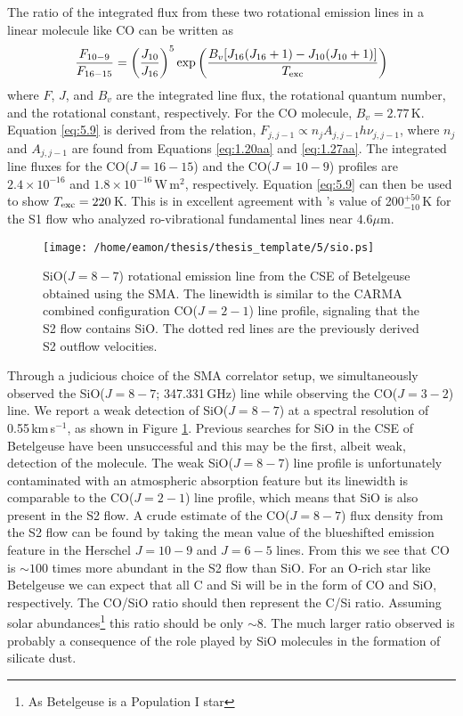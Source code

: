 The ratio of the integrated flux from these two rotational emission lines in a linear molecule like CO can be written as 
\begin{equation}
\frac{F_{10-9}}{F_{16-15}}=\left(\frac{J_{10}}{J_{16}} \right)^5 \mathrm{exp}\left(\frac{B_{v}[J_{16}(J_{16}+1)-J_{10}(J_{10} +1)]}{T_{\rm{exc}}} \right)
\label{eq:5.9}
\end{equation}
where $F$, $J$, and $B_{v}$ are the integrated line flux, the rotational quantum number, and the rotational constant, respectively. For the CO molecule, $B_{v}= 2.77$\,K. Equation \ref{eq:5.9} is derived from the relation, $F_{j,j-1} \propto n_{j}A_{j,j-1}h\nu _{j,j-1}$, where $n_{j}$ and $A_{j,j-1}$ are found from Equations \ref{eq:1.20aa} and \ref{eq:1.27aa}. The integrated line fluxes for the CO($J=16-15$) and the CO($J=10-9$) profiles are $2.4\times 10^{-16}$  and $1.8\times 10^{-16}$\,W\,m$^2$, respectively. Equation \ref{eq:5.9} can then be used to show $T_{\rm{exc}} = 220$\,K. This is in excellent agreement with \citeauthor{bernat_1979}'s \citeyear{bernat_1979} value of 200$^{+50}_{-10}$\,K for the S1 flow who analyzed ro-vibrational fundamental lines near $4.6\mu$m.

\begin{figure}[!hbt]
\centering 
\texttt{[image: /home/eamon/thesis/thesis\_template/5/sio.ps]}
\caption[SiO rotational emission line from the CSE of Betelgeuse]{SiO($J=8-7$) rotational emission line from the CSE of Betelgeuse obtained using the SMA. The linewidth is similar to the CARMA combined configuration CO($J=2-1$) line profile, signaling that the S2 flow contains SiO. The dotted red lines are the previously derived S2 outflow velocities.}
\label{fig:5.12b}
\end{figure}

Through a judicious choice of the SMA correlator setup, we simultaneously observed the SiO($J=8-7$; 347.331\,GHz) line while observing the CO($J=3-2$) line. We report a weak detection of SiO($J = 8-7$)  at a spectral resolution of 0.55\,km\,s$^{-1}$, as shown in Figure \ref{fig:5.12b}. Previous searches for SiO in the CSE of Betelgeuse have been unsuccessful \cite[e.g.,][]{lambert_1978} and this may be the first, albeit weak, detection of the molecule. The weak SiO($J=8-7$) line profile is unfortunately contaminated with an atmospheric absorption feature but its linewidth is comparable to the CO($J=2-1$) line profile, which means that SiO is also present in the S2 flow. A crude estimate of the CO($J=8-7$) flux density from the S2 flow can be found by taking the mean value of the blueshifted emission feature in the Herschel $J=10-9$ and $J=6-5$ lines. From this we see that CO is $\sim 100$ times more abundant in the S2 flow than SiO. For an O-rich star like Betelgeuse we can expect that all C and Si will be in the form of CO and SiO, respectively. The CO/SiO ratio should then represent the C/Si ratio. Assuming solar abundances\footnote{As Betelgeuse is a Population I star} this ratio should be only $\sim 8$. The much larger ratio observed is probably a consequence of the role played by SiO molecules in the formation of silicate dust.


